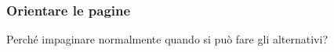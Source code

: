 \begin{frame}
  \frametitle{Orientare le pagine}

  \begin{center}
   
   \begin{turn}{60}
      \begin{minipage}{5cm}
        \begin{center}
          \huge Perché impaginare normalmente quando si può fare gli 
alternativi?
       \end{center}
     \end{minipage}
   \end{turn}
  \end{center}
  
\end{frame}